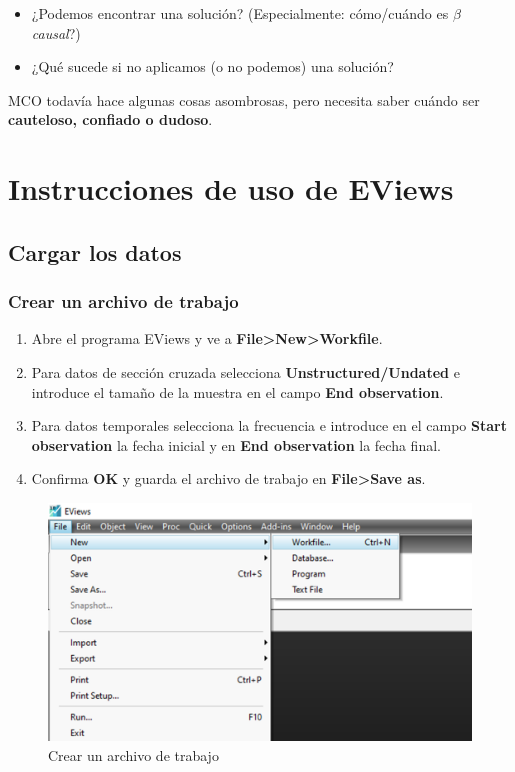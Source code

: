 \documentclass[
]{book}
\providecommand{\tightlist}{%
  \setlength{\itemsep}{0pt}\setlength{\parskip}{0pt}}
\begin{document}
\begin{itemize}
\tightlist
\item
  ¿Podemos encontrar una solución? (Especialmente: cómo/cuándo es \(\beta\) \emph{causal}?)
\item
  ¿Qué sucede si no aplicamos (o no podemos) una solución?
\end{itemize}

MCO todavía hace algunas cosas asombrosas, pero necesita saber cuándo ser \textbf{cauteloso, confiado o dudoso}.

\hypertarget{instrucciones-de-uso-de-eviews}{%
\chapter{Instrucciones de uso de EViews}\label{instrucciones-de-uso-de-eviews}}

\hypertarget{cargar-los-datos}{%
\section{Cargar los datos}\label{cargar-los-datos}}

\hypertarget{crear-un-archivo-de-trabajo}{%
\subsection{Crear un archivo de trabajo}\label{crear-un-archivo-de-trabajo}}

\begin{enumerate}
\def\labelenumi{\arabic{enumi}.}
\tightlist
\item
  Abre el programa EViews y ve a \textbf{File\textgreater New\textgreater Workfile}.
\item
  Para datos de sección cruzada selecciona \textbf{Unstructured/Undated} e introduce el tamaño de la muestra en el campo \textbf{End observation}.
\item
  Para datos temporales selecciona la frecuencia e introduce en el campo \textbf{Start observation} la fecha inicial y en \textbf{End observation} la fecha final.
\item
  Confirma \textbf{OK} y guarda el archivo de trabajo en \textbf{File\textgreater Save as}.
\end{enumerate}

\begin{figure}

{\centering \includegraphics[width=0.75\linewidth]{imagenes/3_1} 

}

\caption{Crear un archivo de trabajo}\label{fig:unnamed-chunk-4}
\end{figure}
\end{document}
